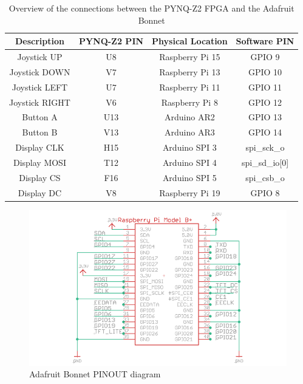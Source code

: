 \begin{table}[!ht]
    \centering
    \begin{tabular}{|c|c|c|c|}
        \hline
        \textbf{Description} & \textbf{PYNQ-Z2 PIN} & \textbf{Physical Location} & \textbf{Software PIN} \\
        \hline
        \hline
        Joystick UP & U8 & Raspberry Pi 15 & GPIO 9 \\
        \hline
        Joystick DOWN & V7 & Raspberry Pi 13 & GPIO 10 \\
        \hline
        Joystick LEFT & U7 & Raspberry Pi 11 & GPIO 11 \\
        \hline
        Joystick RIGHT & V6 & Raspberry Pi 8 & GPIO 12 \\
        \hline
        Button A & U13 & Arduino AR2 & GPIO 13 \\
        \hline
        Button B & V13 & Arduino AR3 & GPIO 14 \\
        \hline
        \hline
        Display CLK & H15 & Arduino SPI 3 & spi\_sck\_o \\
        \hline
        Display MOSI & T12 & Arduino SPI 4 & spi\_sd\_io[0] \\
        \hline
        Display CS & F16 & Arduino SPI 5 & spi\_csb\_o \\
        \hline
        Display DC & V8 & Raspberry Pi 19 & GPIO 8 \\
        \hline
    \end{tabular}
    \caption{Overview of the connections between the PYNQ-Z2 FPGA and the Adafruit Bonnet}
    \label{table:pinout_Adafruit}
\end{table}

\begin{figure}[!ht]
    \centering
    \includegraphics[width=\textwidth]{images/adafruit_PINOUT.png}
    \caption{Adafruit Bonnet PINOUT diagram \cite{adafruitwebsite}}
    \label{fig:adafruitPinout}
\end{figure}

